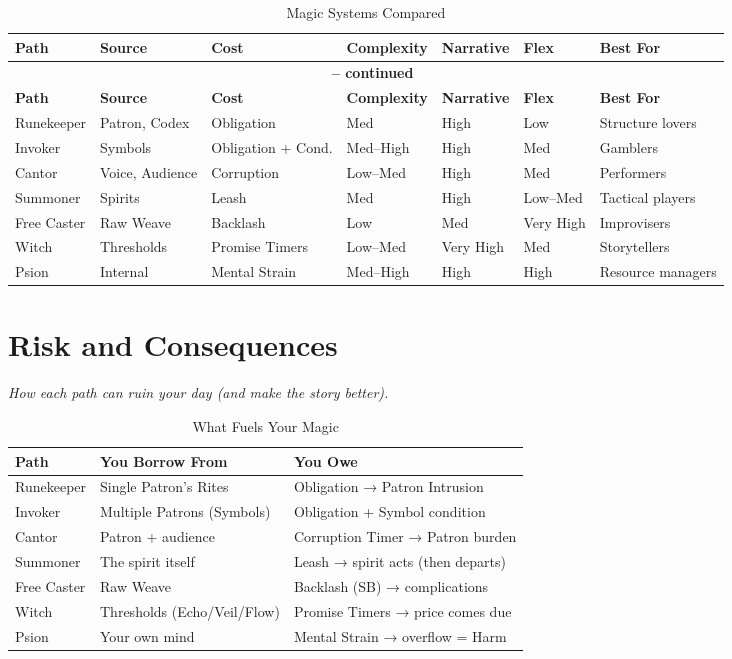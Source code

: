 \documentclass[10pt,a5paper]{book}
\begin{document}
\small
\begin{longtable}{p{2cm} p{2cm} p{1.5cm} p{1.5cm} p{1.5cm} p{1.5cm} p{2cm}}
\caption{Magic Systems Compared}\\
\toprule
\textbf{Path} & \textbf{Source} & \textbf{Cost} & \textbf{Complexity} & \textbf{Narrative} & \textbf{Flex} & \textbf{Best For} \\
\midrule
\endfirsthead
\multicolumn{7}{c}{{\bfseries \tablename\ \thetable{} -- continued}} \\
\toprule
\textbf{Path} & \textbf{Source} & \textbf{Cost} & \textbf{Complexity} & \textbf{Narrative} & \textbf{Flex} & \textbf{Best For} \\
\midrule
\endhead
\bottomrule
\endfoot
Runekeeper & Patron, Codex & Obligation & Med & High & Low & Structure lovers \\
Invoker & Symbols & Obligation + Cond. & Med--High & High & Med & Gamblers \\
Cantor & Voice, Audience & Corruption & Low--Med & High & Med & Performers \\
Summoner & Spirits & Leash & Med & High & Low--Med & Tactical players \\
Free Caster & Raw Weave & Backlash & Low & Med & Very High & Improvisers \\
Witch & Thresholds & Promise Timers & Low--Med & Very High & Med & Storytellers \\
Psion & Internal & Mental Strain & Med--High & High & High & Resource managers \\
\bottomrule
\end{longtable}
\normalsize

\section*{Risk and Consequences}

\noindent \textit{How each path can ruin your day (and make the story better).}

\small
\begin{longtable}{p{2.5cm} p{5cm} p{4cm}}
\caption{What Fuels Your Magic}\\
\toprule
\textbf{Path} & \textbf{You Borrow From} & \textbf{You Owe} \\
\midrule
Runekeeper & Single Patron's Rites & Obligation → Patron Intrusion \\
Invoker & Multiple Patrons (Symbols) & Obligation + Symbol condition \\
Cantor & Patron + audience & Corruption Timer → Patron burden \\
Summoner & The spirit itself & Leash → spirit acts (then departs) \\
Free Caster & Raw Weave & Backlash (SB) → complications \\
Witch & Thresholds (Echo/Veil/Flow) & Promise Timers → price comes due \\
Psion & Your own mind & Mental Strain → overflow = Harm \\
\bottomrule
\end{longtable}
\normalsize
\end{document}
